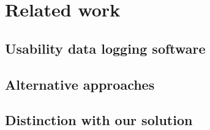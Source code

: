 \chapter{Related work}\label{chapter:related_work}


\section{Usability data logging software}\label{section:software}

\section{Alternative approaches}\label{section:alternative}

\section{Distinction with our solution }\label{section:distinction}
